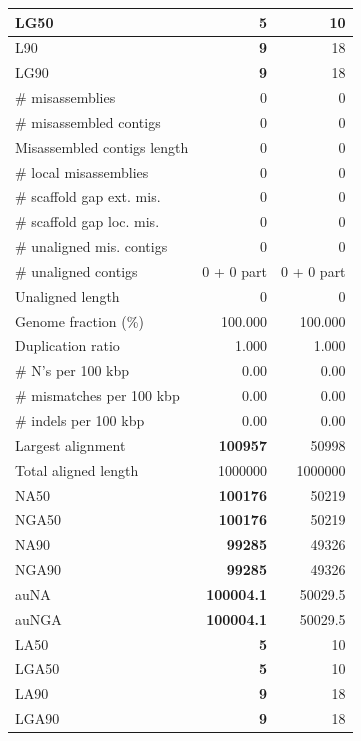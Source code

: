 \documentclass[12pt,a4paper]{article}
\begin{document}
\begin{table}[ht]
\begin{center}
\begin{tabular}{|l*{2}{|r}|}
LG50 & {\bf 5} & 10 \\ \hline
L90 & {\bf 9} & 18 \\ \hline
LG90 & {\bf 9} & 18 \\ \hline
\# misassemblies & 0 & 0 \\ \hline
\# misassembled contigs & 0 & 0 \\ \hline
Misassembled contigs length & 0 & 0 \\ \hline
\# local misassemblies & 0 & 0 \\ \hline
\# scaffold gap ext. mis. & 0 & 0 \\ \hline
\# scaffold gap loc. mis. & 0 & 0 \\ \hline
\# unaligned mis. contigs & 0 & 0 \\ \hline
\# unaligned contigs & 0 + 0 part & 0 + 0 part \\ \hline
Unaligned length & 0 & 0 \\ \hline
Genome fraction (\%) & 100.000 & 100.000 \\ \hline
Duplication ratio & 1.000 & 1.000 \\ \hline
\# N's per 100 kbp & 0.00 & 0.00 \\ \hline
\# mismatches per 100 kbp & 0.00 & 0.00 \\ \hline
\# indels per 100 kbp & 0.00 & 0.00 \\ \hline
Largest alignment & {\bf 100957} & 50998 \\ \hline
Total aligned length & 1000000 & 1000000 \\ \hline
NA50 & {\bf 100176} & 50219 \\ \hline
NGA50 & {\bf 100176} & 50219 \\ \hline
NA90 & {\bf 99285} & 49326 \\ \hline
NGA90 & {\bf 99285} & 49326 \\ \hline
auNA & {\bf 100004.1} & 50029.5 \\ \hline
auNGA & {\bf 100004.1} & 50029.5 \\ \hline
LA50 & {\bf 5} & 10 \\ \hline
LGA50 & {\bf 5} & 10 \\ \hline
LA90 & {\bf 9} & 18 \\ \hline
LGA90 & {\bf 9} & 18 \\ \hline
\end{tabular}
\end{center}
\end{table}
\end{document}
